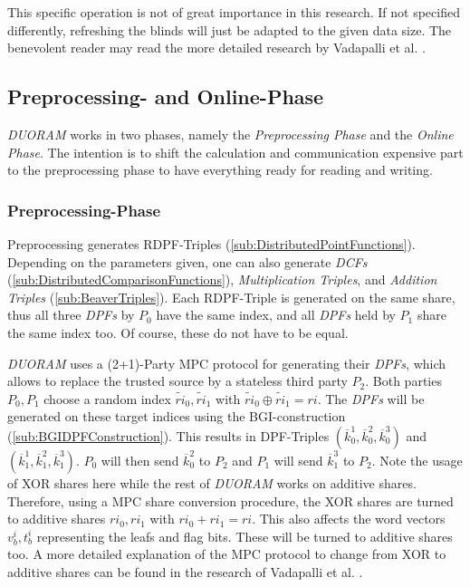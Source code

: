 This specific operation is not of great importance in this research.
If not specified differently, refreshing the blinds will just be adapted to the given data size.
The benevolent reader may read the more detailed research by Vadapalli et al. \cite{vadapalli2023duoram}.

\subsection{Preprocessing- and Online-Phase}
\label{sub:DuoramPreAndOnlinePhase}
\textit{DUORAM} works in two phases, namely the \textit{Preprocessing Phase} and the \textit{Online Phase}.
The intention is to shift the calculation and communication expensive part to the preprocessing phase to have everything ready for reading and writing.

\subsubsection*{Preprocessing-Phase}
\label{subsub:DuoramPreprocessing}
Preprocessing generates RDPF-Triples (\ref{sub:DistributedPointFunctions}).
Depending on the parameters given, one can also generate \textit{DCFs} (\ref{sub:DistributedComparisonFunctions}), \textit{Multiplication Triples}, and \textit{Addition Triples} (\ref{sub:BeaverTriples}).
Each RDPF-Triple is generated on the same share, thus all three \textit{DPFs} by $P_0$ have the same index, and all \textit{DPFs} held by $P_1$ share the same index too.
Of course, these do not have to be equal.

\textit{DUORAM} uses a (2+1)-Party MPC protocol for generating their \textit{DPFs}, which allows to replace the trusted source by a stateless third party $P_2$.
Both parties $P_0,P_1$ choose a random index $\widetilde{ri}_0,\widetilde{ri}_1$ with $\widetilde{ri}_0\oplus\widetilde{ri}_1=ri$.
The \textit{DPFs} will be generated on these target indices using the BGI-construction (\ref{sub:BGIDPFConstruction}).
This results in DPF-Triples $(\overline{k}_0^1,\overline{k}_0^2,\overline{k}_0^3)$ and $(\overline{k}_1^1,\overline{k}_1^2,\overline{k}_1^3)$.
$P_0$ will then send $\overline{k}_0^2$ to $P_2$ and $P_1$ will send $\overline{k}_1^3$ to $P_2$.
Note the usage of XOR shares here while the rest of \textit{DUORAM} works on additive shares.
Therefore, using a MPC share conversion procedure, the XOR shares are turned to additive shares $ri_0,ri_1$ with $ri_0+ri_1=ri$.
This also affects the word vectors $v_b^i,t_b^i$ representing the leafs and flag bits.
These will be turned to additive shares too.
A more detailed explanation of the MPC protocol to change from XOR to additive shares can be found in the research of Vadapalli et al. \cite{vadapalli2023duoram}.


